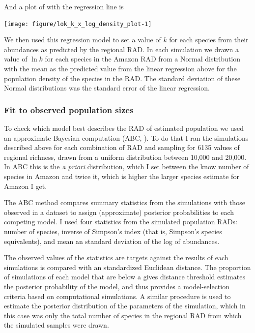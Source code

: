 \documentclass[12pt, A4]{article}\usepackage[]{graphicx}\usepackage[]{color}
\newenvironment{knitrout}{}{} %
\begin{document}
And a plot of with the regression line is

\begin{knitrout}
\color{fgcolor}

{\centering \texttt{[image: figure/lok\_k\_x\_log\_density\_plot-1]} 

}



\end{knitrout}

We then used this regression model to set a value of $k$ for each species from
their abundances as predicted by the regional RAD. 
In each simulation we drawn a value of $\ln k$ for each species
in the Amazon RAD from a Normal distribution with the mean as
the predicted value from the linear regression above for the population
density of the species in the RAD. The standard deviation of these
Normal distributions was the standard error of the linear regression.

\subsubsection*{Fit to observed population sizes}
\label{sec:fit-observ-popul}

To check which model best describes the RAD of estimated population we
used an approximate Bayesian computation (ABC, \citet{csillery2010,csillery2012}). 
To do that I ran 
the simulations described above for each combination of RAD and sampling
for 6135 values of regional richness, drawn from a uniform
distribution between 10,000 and 20,000. In ABC this is the \emph{a priori}
distribution, which I set between the know number of species in Amazon and
twice it, which is higher the larger species estimate for Amazon I get.

The ABC method compares summary statistics from the simulations with those observed
in a dataset to assign (approximate) posterior probabilities to each competing model.
I used four statistics from the simulated population RADs: number of species, inverse of Simpson's index
(that is, Simpson's species equivalents), and mean an standard deviation of the log of abundances.

The observed values of the statistics are targets against the results of each simulations is compared with an standardized
Euclidean distance. The proportion of simulations of each model that are below a gives distance threshold estimates the
posterior probability of the model, and thus provides a model-selection criteria based on computational simulations.
A similar procedure is used to estimate the posterior distribution of the parameters of the simulation, which in this case
was only the total number of species in the regional RAD from which the simulated samples were drawn.
\end{document}
